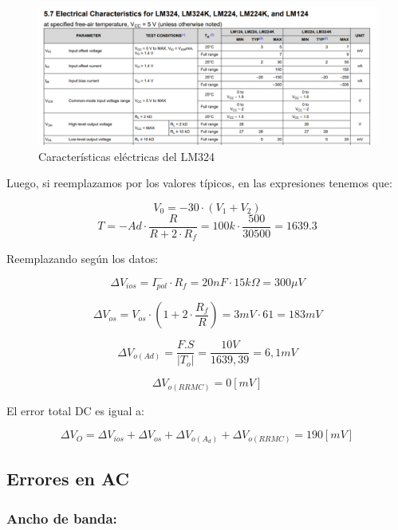 \begin{figure}[h!]
    \centering
    \includegraphics[width=1\linewidth]{img/dc_datasheet.png}
    \caption{Características eléctricas del LM324}
    \label{fig:caracteristicas}
\end{figure}
   
Luego, si reemplazamos por los valores típicos, en las expresiones tenemos que:


\[V_{0} = -30 \cdot (V_1 + V_2) \]
\[T = - Ad   \cdot  \frac{R}{R + 2\cdot R_f} = 100k \cdot \frac{500}{30500} = 1639.3\]

Reemplazando según los datos:
 
\[ \Delta V_{ios} = I_{pol}^{-} \cdot R_f = 20 nF \cdot 15k\Omega = 300 \mu V \]

\vspace{1em}

\[ \Delta V_{os}  = V_{os} \cdot (1 + 2 \cdot \frac {R_f}{R})  =
3mV \cdot 61 = 183 mV \]

\vspace{1em}

\[ \Delta V_{o (Ad)}=\frac{F.S}{\left|T_{o}\right|} = \frac{10V}{1639,39} = 6,1 mV\]

\vspace{1em}

\[ \Delta V_{o (RRMC) } = 0 [ mV ]\]

El error total DC es igual a:

\[ \Delta V_{O} = \Delta V_{ios} + \Delta V_{os} +  \Delta V_{o (A_d)} + \Delta V_{o (RRMC) } = 190 [mV]\]

\subsection{Errores en AC}
 
\subsubsection{Ancho de banda:}

